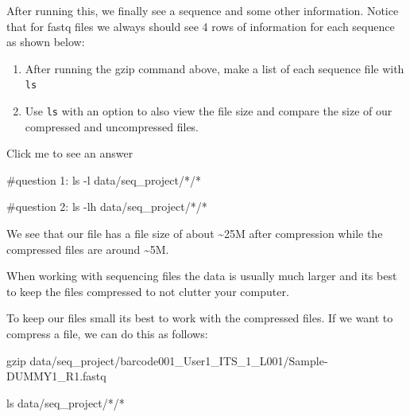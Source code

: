 \documentclass[
  letterpaper,
  DIV=11,
  numbers=noendperiod]{scrreprt}
\newenvironment{Shaded}{}{}
\newcommand{\AttributeTok}[1]{\textcolor[rgb]{0.84,0.23,0.29}{#1}}
\newcommand{\CommentTok}[1]{\textcolor[rgb]{0.42,0.45,0.49}{#1}}
\newcommand{\FunctionTok}[1]{\textcolor[rgb]{0.44,0.26,0.76}{#1}}
\newcommand{\NormalTok}[1]{\textcolor[rgb]{0.14,0.16,0.18}{#1}}
\newcommand{\PreprocessorTok}[1]{\textcolor[rgb]{0.84,0.23,0.29}{#1}}
\providecommand{\tightlist}{%
  \setlength{\itemsep}{0pt}\setlength{\parskip}{0pt}}\usepackage{longtable,booktabs,array}
\begin{document}
After running this, we finally see a sequence and some other
information. Notice that for fastq files we always should see 4 rows of
information for each sequence as shown below:

\begin{tcolorbox}[enhanced jigsaw, breakable, left=2mm, title=\textcolor{quarto-callout-caution-color}{\faFire}\hspace{0.5em}{Exercise}, opacityback=0, opacitybacktitle=0.6, rightrule=.15mm, bottomrule=.15mm, colback=white, colframe=quarto-callout-caution-color-frame, coltitle=black, bottomtitle=1mm, arc=.35mm, toprule=.15mm, colbacktitle=quarto-callout-caution-color!10!white, toptitle=1mm, titlerule=0mm, leftrule=.75mm]

\begin{enumerate}
\def\labelenumi{\arabic{enumi}.}
\tightlist
\item
  After running the gzip command above, make a list of each sequence
  file with \texttt{ls}
\item
  Use \texttt{ls} with an option to also view the file size and compare
  the size of our compressed and uncompressed files.
\end{enumerate}

Click me to see an answer

\begin{Shaded}
\begin{Highlighting}[]
\CommentTok{\#question 1:}
\FunctionTok{ls} \AttributeTok{{-}l}\NormalTok{ data/seq\_project/}\PreprocessorTok{*}\NormalTok{/}\PreprocessorTok{*}

\CommentTok{\#question 2:}
\FunctionTok{ls} \AttributeTok{{-}lh}\NormalTok{ data/seq\_project/}\PreprocessorTok{*}\NormalTok{/}\PreprocessorTok{*}
\end{Highlighting}
\end{Shaded}

We see that our file has a file size of about \textasciitilde25M after
compression while the compressed files are around \textasciitilde5M.

When working with sequencing files the data is usually much larger and
its best to keep the files compressed to not clutter your computer.

\end{tcolorbox}

To keep our files small its best to work with the compressed files. If
we want to compress a file, we can do this as follows:

\begin{Shaded}
\begin{Highlighting}[]
\FunctionTok{gzip}\NormalTok{ data/seq\_project/barcode001\_User1\_ITS\_1\_L001/Sample{-}DUMMY1\_R1.fastq}

\FunctionTok{ls}\NormalTok{ data/seq\_project/}\PreprocessorTok{*}\NormalTok{/}\PreprocessorTok{*}
\end{Highlighting}
\end{Shaded}
\end{document}
